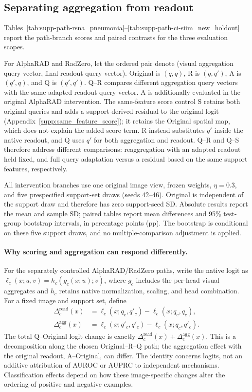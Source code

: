 \subsection{Separating aggregation from readout}
\label{supp:alpha_paths}
Tables~\ref{tab:supp-path-rsna_pneumonia}--\ref{tab:supp-path-ci-siim_new_holdout} report the path-branch scores and paired contrasts for the three evaluation scopes.

For AlphaRAD and RadZero, let the ordered pair denote (visual aggregation query vector, final readout query vector). Original is $(q,q)$, R is $(q,q')$, A is $(q',q)$, and Q is $(q',q')$. Q--R compares different aggregation query vectors with the same adapted readout query vector. A is additionally evaluated in the original AlphaRAD intervention. The same-feature score control S retains both original queries and adds a support-derived residual to the original logit (Appendix~\ref{supp:same_feature_score}); it retains the Original spatial map, which does not explain the added score term. R instead substitutes $q'$ inside the native readout, and Q uses $q'$ for both aggregation and readout. Q--R and Q--S therefore address different comparisons: reaggregation with an adapted readout held fixed, and full query adaptation versus a residual based on the same support features, respectively.

All intervention branches use one original image view, frozen weights, $\eta=0.3$, and five prespecified support-set draws (seeds 42--46). Original is independent of the support draw and therefore has zero support-seed SD. Absolute results report the mean and sample SD; paired tables report mean differences and 95\% test-group bootstrap intervals, in percentage points (pp). The bootstrap is conditional on these five support draws, and no multiple-comparison adjustment is applied.

\paragraph{Why scoring and aggregation can respond differently.}
\label{supp:path_interpretation}
For the separately controlled AlphaRAD/RadZero paths, write the native logit as $\ell_c(x;u,v)=h_c(g_c(x;u);v)$, where $g_c$ includes the per-head visual aggregates and $h_c$ retains native normalization, scaling, and head combination. For a fixed image and support set, define
\begin{equation}
\begin{aligned}
\Delta_c^{\mathrm{read}}(x)&=\ell_c(x;q_c,q'_c)-\ell_c(x;q_c,q_c),\\
\Delta_c^{\mathrm{agg}}(x)&=\ell_c(x;q'_c,q'_c)-\ell_c(x;q_c,q'_c).
\end{aligned}
\label{eq:supp-path-decomposition}
\end{equation}
The total Q--Original logit change is exactly $\Delta_c^{\mathrm{read}}(x)+\Delta_c^{\mathrm{agg}}(x)$. This is a decomposition along the chosen Original--R--Q path; the aggregation effect with the original readout, A--Original, can differ. The identity concerns logits, not an additive attribution of AUROC or AUPRC to independent mechanisms. Classification effects depend on how these image-specific changes alter the ordering of positive and negative examples.

